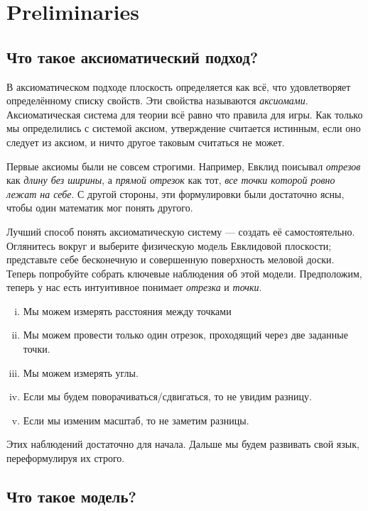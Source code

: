\chapter{Preliminaries}\label{chap:metr}

\section*{Что такое аксиоматический подход?}

В аксиоматическом подходе плоскость определяется как всё, что удовлетворяет определённому списку свойств.
Эти свойства называются {}\emph{аксиомами}.
Аксиоматическая система для теории
всё равно что правила для игры.
Как только мы определились с системой аксиом, утверждение считается истинным, если оно следует из аксиом, и ничто другое таковым считаться не может.

Первые аксиомы были не совсем строгими.
Например, Евклид поисывал {}\emph{отрезов} как {}\emph{длину без ширины},
а {}\emph{прямой отрезок} как тот, {}\emph{все точки которой ровно лежат на себе}.
С другой стороны,
эти формулировки были достаточно ясны,
чтобы один математик мог понять другого.

Лучший способ понять аксиоматическую систему
— создать её самостоятельно.
Оглянитесь вокруг и выберите физическую модель
Евклидовой плоскости;
представьте себе бесконечную и совершенную поверхность меловой доски.
Теперь попробуйте собрать ключевые наблюдения
об этой модели.
Предположим, теперь у нас есть интуитивное понимает {}\emph{отрезка} и {}\emph{точки}.
\begin{enumerate}[(i)]
 \item\label{preaxiomI} Мы можем измерять расстояния между точками
 \item\label{preaxiomII} Мы можем провести только один отрезок,
проходящий через две заданные точки.
 \item\label{preaxiomIII} Мы можем измерять углы.
 \item\label{preaxiomIV} Если мы будем поворачиваться/сдвигаться, то не увидим разницу.
 \item\label{preaxiomV} Если мы изменим масштаб, то не заметим разницы.
\end{enumerate}
Этих наблюдений достаточно для начала.
Дальше мы будем развивать свой язык,
переформулируя их строго.

\section*{Что такое модель?}
\label{page:model}

